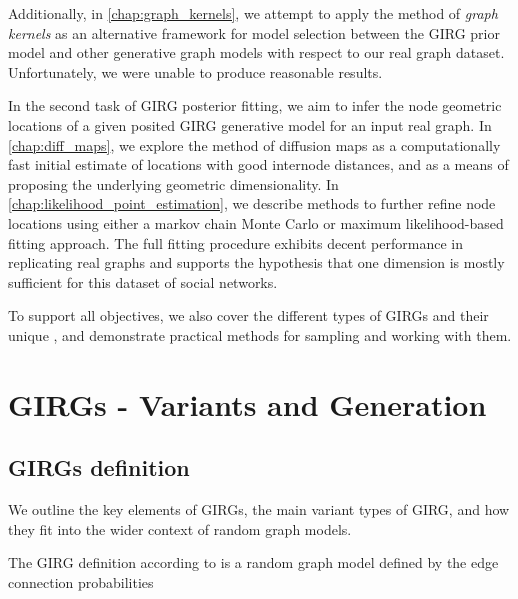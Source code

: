 Additionally, in \cref{chap:graph_kernels}, we attempt to apply the method of \textit{graph kernels} as an alternative framework for model selection between the GIRG prior model and other generative graph models with respect to our real graph dataset. Unfortunately, we were unable to produce reasonable results.



In the second task of GIRG posterior fitting, we aim to infer the node geometric locations of a given posited GIRG generative model for an input real graph. In \cref{chap:diff_maps}, we explore the method of diffusion maps as a computationally fast initial estimate of locations with good internode distances, and as a means of proposing the underlying geometric dimensionality. In \cref{chap:likelihood_point_estimation}, we describe methods to further refine node locations using either a markov chain Monte Carlo or maximum likelihood-based fitting approach. The full fitting procedure exhibits decent performance in replicating real graphs and supports the hypothesis that one dimension is mostly sufficient for this dataset of social networks.

To support all objectives, we also cover the different types of GIRGs and their unique , and demonstrate practical methods for sampling and working with them.



\chapter{GIRGs - Variants and Generation}
\minitoc
\section{GIRGs definition}
\label{sec:GIRG_def}
We outline the key elements of GIRGs, the main variant types of GIRG, and how they fit into the wider context of random graph models.

The GIRG definition according to \cite{bringmann2019geometric} is a random graph model defined by the edge connection probabilities

